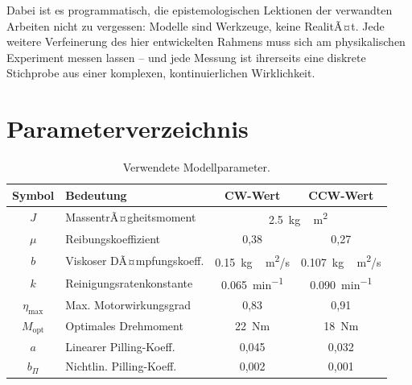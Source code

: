 ﻿\documentclass[12pt,a4paper]{article}
\theoremstyle{remark}
\begin{document}
	Dabei ist es programmatisch, die epistemologischen Lektionen der verwandten Arbeiten
	\cite{epp2026digi, epp2026physd} nicht zu vergessen: Modelle sind Werkzeuge, keine
	RealitÃ¤t. Jede weitere Verfeinerung des hier entwickelten Rahmens muss sich am
	physikalischen Experiment messen lassen -- und jede Messung ist ihrerseits eine
	diskrete Stichprobe aus einer komplexen, kontinuierlichen Wirklichkeit.
	
	\appendix
	\section{Parameterverzeichnis}
	
	\begin{table}[H]
		\centering
		\caption{Verwendete Modellparameter.}
		\begin{tabular}{clcc}
			\toprule
			Symbol & Bedeutung & CW-Wert & CCW-Wert \\
			\midrule
			$J$             & MassentrÃ¤gheitsmoment  & \multicolumn{2}{c}{\SI{2.5}{kg\,m^2}} \\
			$\mu$           & Reibungskoeffizient    & 0{,}38  & 0{,}27 \\
			$b$             & Viskoser DÃ¤mpfungskoeff.& \SI{0.15}{kg\,m^2/s} & \SI{0.107}{kg\,m^2/s} \\
			$k$             & Reinigungsratenkonstante & \SI{0.065}{min^{-1}} & \SI{0.090}{min^{-1}} \\
			$\eta_{\max}$   & Max. Motorwirkungsgrad & 0{,}83 & 0{,}91 \\
			$M_{\mathrm{opt}}$ & Optimales Drehmoment & \SI{22}{Nm} & \SI{18}{Nm} \\
			$a$             & Linearer Pilling-Koeff. & 0{,}045 & 0{,}032 \\
			$b_{\Pi}$       & Nichtlin. Pilling-Koeff. & 0{,}002 & 0{,}001 \\
			\bottomrule
		\end{tabular}
	\end{table}
	
\end{document}

